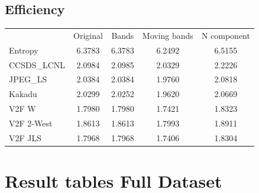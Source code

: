 \documentclass{article}
\begin{document}
\subsection*{Efficiency}
\begin{table}[h]
\begin{tabular}{lcccc}
\rowcolor[HTML]{C0C0C0} 
 & Original & Bands & Moving bands & N component \\
\cellcolor[HTML]{C0C0C0}Entropy & \cellcolor[HTML]{E0E0E0} 6.3783&  \cellcolor[HTML]{E0E0E0} 6.3783&  \cellcolor[HTML]{E0E0E0} 6.2492&  \cellcolor[HTML]{E0E0E0} 6.5155\\ 
\cellcolor[HTML]{C0C0C0}CCSDS\_LCNL & 2.0984 & 2.0985 & 2.0329 & \cellcolor[HTML]{DAE8FC}2.2226  \\
\cellcolor[HTML]{C0C0C0}JPEG\_LS    & 2.0384 & 2.0384 & 1.9760 & \cellcolor[HTML]{DAE8FC}2.0818  \\
\cellcolor[HTML]{C0C0C0}Kakadu      & 2.0299 & 2.0252 & 1.9620 & \cellcolor[HTML]{DAE8FC}2.0669  \\
\cellcolor[HTML]{C0C0C0}V2F W       & 1.7980 & 1.7980 & 1.7421 & \cellcolor[HTML]{DAE8FC}1.8323  \\
\cellcolor[HTML]{C0C0C0}V2F 2-West  & 1.8613 & 1.8613 & 1.7993 & \cellcolor[HTML]{DAE8FC}1.8911  \\
\cellcolor[HTML]{C0C0C0}V2F JLS     & 1.7968 & 1.7968 & 1.7406 & \cellcolor[HTML]{DAE8FC}1.8304  \\
\end{tabular}
\end{table}


\newpage
\section*{Result tables Full Dataset}
\end{document}
